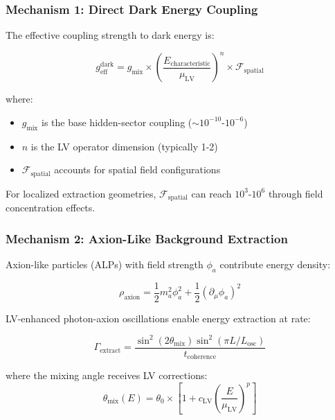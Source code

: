 \documentclass[12pt]{article}
\begin{document}
\subsubsection{Mechanism 1: Direct Dark Energy Coupling}

The effective coupling strength to dark energy is:

\begin{equation}
g_{\text{eff}}^{\text{dark}} = g_{\text{mix}} \times \left(\frac{E_{\text{characteristic}}}{\mu_{\text{LV}}}\right)^n \times \mathcal{F}_{\text{spatial}}
\end{equation}

where:
\begin{itemize}
\item $g_{\text{mix}}$ is the base hidden-sector coupling ($\sim 10^{-10}$-$10^{-6}$)
\item $n$ is the LV operator dimension (typically 1-2)
\item $\mathcal{F}_{\text{spatial}}$ accounts for spatial field configurations
\end{itemize}

For localized extraction geometries, $\mathcal{F}_{\text{spatial}}$ can reach $10^3$-$10^6$ through field concentration effects.

\subsubsection{Mechanism 2: Axion-Like Background Extraction}

Axion-like particles (ALPs) with field strength $\phi_a$ contribute energy density:

\begin{equation}
\rho_{\text{axion}} = \frac{1}{2}m_a^2\phi_a^2 + \frac{1}{2}(\partial_{\mu}\phi_a)^2
\end{equation}

LV-enhanced photon-axion oscillations enable energy extraction at rate:

\begin{equation}
\Gamma_{\text{extract}} = \frac{\sin^2(2\theta_{\text{mix}}) \sin^2(\pi L/L_{\text{osc}})}{t_{\text{coherence}}}
\end{equation}

where the mixing angle receives LV corrections:
\begin{equation}
\theta_{\text{mix}}(E) = \theta_0 \times \left[1 + c_{\text{LV}}\left(\frac{E}{\mu_{\text{LV}}}\right)^p\right]
\end{equation}
\end{document}
